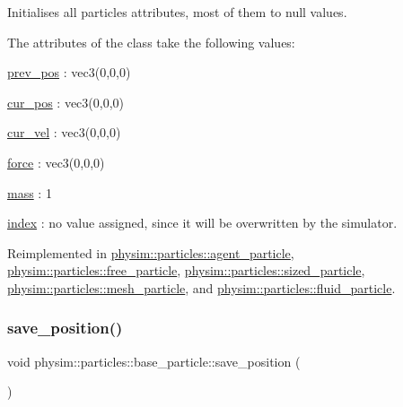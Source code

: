 Initialises all particle\textquotesingle{}s attributes, most of them to null values. 

The attributes of the class take the following values\+:
\begin{DoxyItemize}
\item \hyperlink{classphysim_1_1particles_1_1base__particle_a08072db6a1a59d21acc9cac6ac8965f7}{prev\+\_\+pos} \+: vec3(0,0,0)
\item \hyperlink{classphysim_1_1particles_1_1base__particle_a6298a121dea043741e5d3722386163c6}{cur\+\_\+pos} \+: vec3(0,0,0)
\item \hyperlink{classphysim_1_1particles_1_1base__particle_a66a164d2a130c40901e3ec2709cdad43}{cur\+\_\+vel} \+: vec3(0,0,0)
\item \hyperlink{classphysim_1_1particles_1_1base__particle_adc3b11899d2e50970ae5d4931721a0ef}{force} \+: vec3(0,0,0)
\item \hyperlink{classphysim_1_1particles_1_1base__particle_acb5c9f0b4a911d8981210e2cfc4dda8a}{mass} \+: 1
\item \hyperlink{classphysim_1_1particles_1_1base__particle_a44f5de3bb4b860dfd511e28e1d6519d5}{index} \+: no value assigned, since it will be overwritten by the simulator. 
\end{DoxyItemize}

Reimplemented in \hyperlink{classphysim_1_1particles_1_1agent__particle_ac13082909f480fc55d406321c77d38b1}{physim\+::particles\+::agent\+\_\+particle}, \hyperlink{classphysim_1_1particles_1_1free__particle_a0df21e64a28c5fdf471d54a50b59fea3}{physim\+::particles\+::free\+\_\+particle}, \hyperlink{classphysim_1_1particles_1_1sized__particle_a63de84961417c1522c0ca576697cd972}{physim\+::particles\+::sized\+\_\+particle}, \hyperlink{classphysim_1_1particles_1_1mesh__particle_a1b3c3eac1e62296c2facd8c9d9b84608}{physim\+::particles\+::mesh\+\_\+particle}, and \hyperlink{classphysim_1_1particles_1_1fluid__particle_a0aa522f9400bcb02373edd7bb073249b}{physim\+::particles\+::fluid\+\_\+particle}.

\mbox{\label{classphysim_1_1particles_1_1base__particle_aee1ed4e0daca8db01c3a8f150fcdbbb1}} 
\subsubsection{\texorpdfstring{save\+\_\+position()}{save\_position()}}
{\footnotesize\ttfamily void physim\+::particles\+::base\+\_\+particle\+::save\+\_\+position (\begin{DoxyParamCaption}{ }\end{DoxyParamCaption})}



